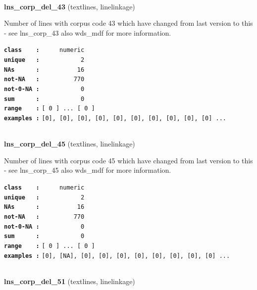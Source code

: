 \documentclass[]{article}
\begin{document}
~

\textbf{lns\_corp\_del\_43} (textlines, linelinkage)

Number of lines with corpus code 43 which have changed from last version
to this - see lns\_corp\_43 also wds\_mdf for more information.

\textbf{\texttt{class\ \ \ \ :}} \texttt{~~~~~numeric}\\
\textbf{\texttt{unique\ \ \ :}} \texttt{~~~~~~~~~~~2}\\
\textbf{\texttt{NAs\ \ \ \ \ \ :}} \texttt{~~~~~~~~~~16}\\
\textbf{\texttt{not-NA\ \ \ :}} \texttt{~~~~~~~~~770}\\
\textbf{\texttt{not-0-NA\ :}} \texttt{~~~~~~~~~~~0}\\
\textbf{\texttt{sum\ \ \ \ \ \ :}} \texttt{~~~~~~~~~~~0}\\
\textbf{\texttt{range\ \ \ \ :}}
\texttt{{[}\ 0\ {]}\ ...\ {[}\ 0\ {]}}\\
\textbf{\texttt{examples\ :}}
\texttt{{[}0{]},\ {[}0{]},\ {[}0{]},\ {[}0{]},\ {[}0{]},\ {[}0{]},\ {[}0{]},\ {[}0{]},\ {[}0{]},\ {[}0{]}\ ...}\\

~

\textbf{lns\_corp\_del\_45} (textlines, linelinkage)

Number of lines with corpus code 45 which have changed from last version
to this - see lns\_corp\_45 also wds\_mdf for more information.

\textbf{\texttt{class\ \ \ \ :}} \texttt{~~~~~numeric}\\
\textbf{\texttt{unique\ \ \ :}} \texttt{~~~~~~~~~~~2}\\
\textbf{\texttt{NAs\ \ \ \ \ \ :}} \texttt{~~~~~~~~~~16}\\
\textbf{\texttt{not-NA\ \ \ :}} \texttt{~~~~~~~~~770}\\
\textbf{\texttt{not-0-NA\ :}} \texttt{~~~~~~~~~~~0}\\
\textbf{\texttt{sum\ \ \ \ \ \ :}} \texttt{~~~~~~~~~~~0}\\
\textbf{\texttt{range\ \ \ \ :}}
\texttt{{[}\ 0\ {]}\ ...\ {[}\ 0\ {]}}\\
\textbf{\texttt{examples\ :}}
\texttt{{[}0{]},\ {[}NA{]},\ {[}0{]},\ {[}0{]},\ {[}0{]},\ {[}0{]},\ {[}0{]},\ {[}0{]},\ {[}0{]},\ {[}0{]}\ ...}\\

~

\textbf{lns\_corp\_del\_51} (textlines, linelinkage)
\end{document}
